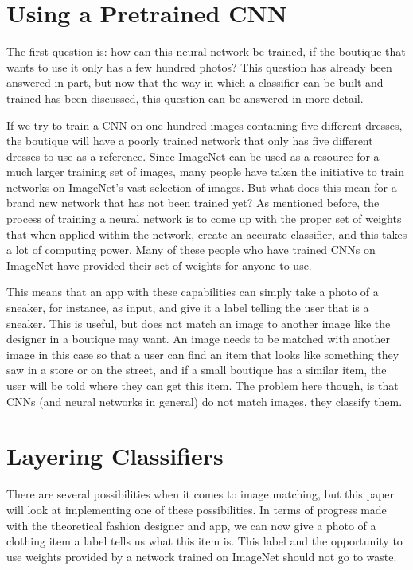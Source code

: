\documentclass[12pt]{report} %
\begin{document}
\section{Using a Pretrained CNN}
	The first question is: how can this neural network be trained, if the boutique that wants to use it only has a few hundred photos? This question has already been answered in part, but now that the way in which a classifier can be built and trained has been discussed, this question can be answered in more detail. 
	
	If we try to train a CNN on one hundred images containing five different dresses, the boutique will have a poorly trained network that only has five different dresses to use as a reference. Since ImageNet can be used as a resource for a much larger training set of images, many people have taken the initiative to train networks on ImageNet's vast selection of images. But what does this mean for a brand new network that has not been trained yet? As mentioned before, the process of training a neural network is to come up with the proper set of weights that when applied within the network, create an accurate classifier, and this takes a lot of computing power. Many of these people who have trained CNNs on ImageNet have provided their set of weights for anyone to use. 
	
	This means that an app with these capabilities can simply take a photo of a sneaker, for instance, as input, and give it a label telling the user that is a sneaker. This is useful, but does not match an image to another image like the designer in a boutique may want. An image needs to be matched with another image in this case so that a user can find an item that looks like something they saw in a store or on the street, and if a small boutique has a similar item, the user will be told where they can get this item. The problem here though, is that CNNs (and neural networks in general) do not match images, they classify them. 

\section{Layering Classifiers}
	There are several possibilities when it comes to image matching, but this paper will look at implementing one of these possibilities. In terms of progress made with the theoretical fashion designer and app, we can now give a photo of a clothing item a label tells us what this item is. This label and the opportunity to use weights provided by a network trained on ImageNet should not go to waste.
	
\end{document}
